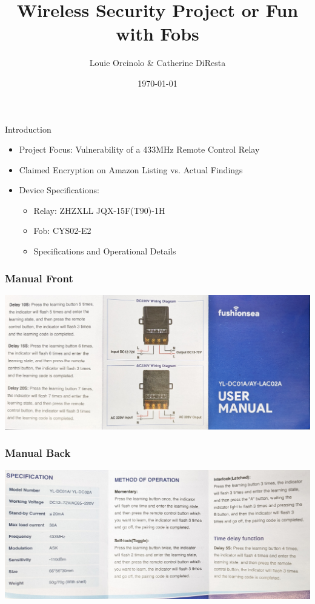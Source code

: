 \documentclass{beamer}
\title{Wireless Security Project or Fun with Fobs}
\author{Louie Orcinolo \& Catherine DiResta}
\date{\today}
\begin{document}
\frame{\titlepage}

\begin{frame}{Introduction}
    \begin{itemize}
        \item Project Focus: Vulnerability of a 433MHz Remote Control Relay
        \item Claimed Encryption on Amazon Listing vs. Actual Findings
        \item Device Specifications:
            \begin{itemize}
                \item Relay: ZHZXLL JQX-15F(T90)-1H
                \item Fob: CYS02-E2
                \item Specifications and Operational Details
            \end{itemize}
    \end{itemize}
\end{frame}


\begin{frame}
\frametitle{Manual Front}
  \includegraphics[width=\textwidth]{../Pics/device/manual_front.jpg}
\end{frame}

\begin{frame}
\frametitle{Manual Back}
  \includegraphics[width=\textwidth]{../Pics/device/manual_back.jpg}
\end{frame}
\end{document}
